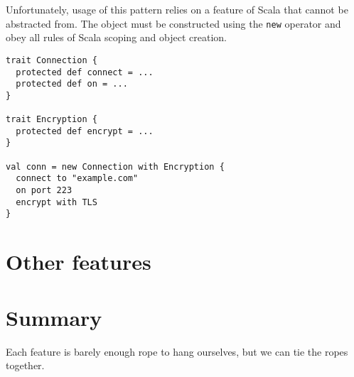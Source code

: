 Unfortunately, usage of this pattern relies on a feature of Scala that cannot be abstracted from. The object must be constructed using the \texttt{new} operator and obey all rules of Scala scoping and object creation.

\begin{lstlisting}[caption=Anonymous classes, label=code:anonymous]
trait Connection {
  protected def connect = ...
  protected def on = ...
}

trait Encryption {
  protected def encrypt = ...
}

val conn = new Connection with Encryption {
  connect to "example.com"
  on port 223
  encrypt with TLS
}
\end{lstlisting}

\section{Other features}

\section{Summary}
Each feature is barely enough rope to hang ourselves, but we can tie the ropes together.
